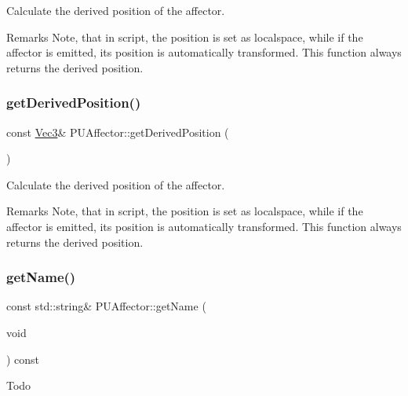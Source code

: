 Calculate the derived position of the affector. \begin{DoxyRemark}{Remarks}
Note, that in script, the position is set as localspace, while if the affector is emitted, its position is automatically transformed. This function always returns the derived position. 
\end{DoxyRemark}
\mbox{\label{classPUAffector_a2230dd7430d9586cb922626c93b6bb79}} 
\subsubsection{\texorpdfstring{get\+Derived\+Position()}{getDerivedPosition()}\hspace{0.1cm}{\footnotesize\ttfamily [2/2]}}
{\footnotesize\ttfamily const \hyperlink{classVec3}{Vec3}\& P\+U\+Affector\+::get\+Derived\+Position (\begin{DoxyParamCaption}{ }\end{DoxyParamCaption})}

Calculate the derived position of the affector. \begin{DoxyRemark}{Remarks}
Note, that in script, the position is set as localspace, while if the affector is emitted, its position is automatically transformed. This function always returns the derived position. 
\end{DoxyRemark}
\mbox{\label{classPUAffector_af5f6499f64032484591415629a1caea1}} 
\subsubsection{\texorpdfstring{get\+Name()}{getName()}\hspace{0.1cm}{\footnotesize\ttfamily [1/2]}}
{\footnotesize\ttfamily const std\+::string\& P\+U\+Affector\+::get\+Name (\begin{DoxyParamCaption}\item[{void}]{ }\end{DoxyParamCaption}) const\hspace{0.3cm}{\ttfamily [inline]}}

Todo \mbox{\label{classPUAffector_af5f6499f64032484591415629a1caea1}} 
